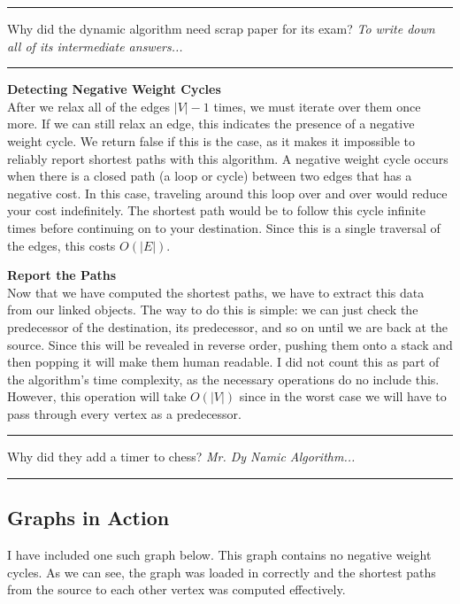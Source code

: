 \documentclass[letterpaper, 10pt]{article}
\begin{document}

\hrule
\vspace{.25cm}
Why did the dynamic algorithm need scrap paper for its exam? \textit{To write down all of its intermediate answers...}
\vspace{.25cm}
\hrule 
\noindent\newline\newline
\textbf{Detecting Negative Weight Cycles} \\
\indent After we relax all of the edges $|V| - 1$ times, we must iterate over them once more. If we can still relax an edge, this indicates the presence of a negative weight cycle. We return false if this is the case, as it makes it impossible to reliably report shortest paths with this algorithm. A negative weight cycle occurs when there is a closed path (a loop or cycle) between two edges that has a negative cost. In this case, traveling around this loop over and over would reduce your cost indefinitely. The shortest path would be to follow this cycle infinite times before continuing on to your destination. Since this is a single traversal of the edges, this costs $O(|E|)$.




\noindent\newline
\textbf{Report the Paths} \\
\indent Now that we have computed the shortest paths, we have to extract this data from our linked objects. The way to do this is simple: we can just check the predecessor of the destination, its predecessor, and so on until we are back at the source. Since this will be revealed in reverse order, pushing them onto a stack and then popping it will make them human readable. I did not count this as part of the algorithm's time complexity, as the necessary operations do no include this. However, this operation will take $O(|V|)$ since in the worst case we will have to pass through every vertex as a predecessor. 


\hrule
\vspace{.25cm}
Why did they add a timer to chess? \textit{Mr. Dy Namic Algorithm...}\\
\hrule
\vspace{.5cm}

\subsection{Graphs in Action}
I have included one such graph below. This graph contains no negative weight cycles. As we can see, the graph was loaded in correctly and the shortest paths from the source to each other vertex was computed effectively. 

\end{document}
